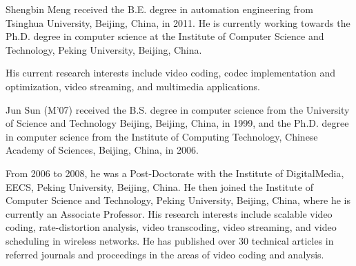 \documentclass[journal]{IEEEtran}
\begin{document}
\begin{IEEEbiography}{Shengbin Meng}
received the B.E. degree in automation engineering from Tsinghua University, Beijing, China, in 2011. He is currently working towards the Ph.D. degree in computer science at the Institute of Computer Science and Technology, Peking University, Beijing, China.

His current research interests include video coding, codec implementation and optimization, video streaming, and multimedia applications.
\end{IEEEbiography}

\begin{IEEEbiography}{Jun Sun}
(M’07) received the B.S. degree in computer science from the University of Science and Technology Beijing, Beijing, China, in 1999, and the Ph.D. degree in computer science from the Institute of Computing Technology, Chinese Academy of Sciences, Beijing, China, in 2006.

From 2006 to 2008, he was a Post-Doctorate with the Institute of DigitalMedia, EECS, Peking University, Beijing, China. He then joined the Institute of Computer Science and Technology, Peking University, Beijing, China, where he is currently an Associate Professor. His research interests include scalable video coding, rate-distortion analysis, video transcoding, video streaming, and video scheduling in wireless networks. He has published over 30 technical articles in referred journals and proceedings in the areas of video coding and analysis.
\end{IEEEbiography}
\end{document}
